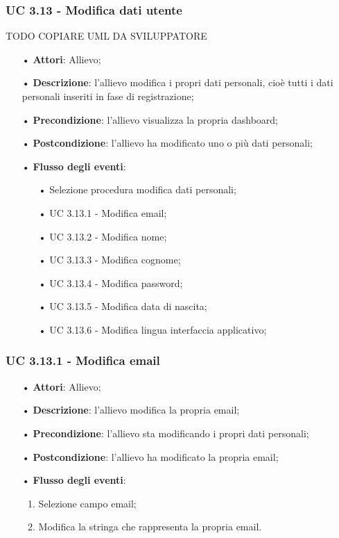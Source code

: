 \subsubsection{UC 3.13 - Modifica dati utente}
{\huge TODO  COPIARE UML DA SVILUPPATORE}
\begin{itemize}
\item[•] \textbf{Attori}: Allievo;
\item[•] \textbf{Descrizione}: l'allievo modifica i propri dati personali, cioè tutti i dati personali inseriti in fase di registrazione;
\item[•] \textbf{Precondizione}: l'allievo visualizza la propria dashboard;
\item[•] \textbf{Postcondizione}: l'allievo ha modificato uno o più dati personali;
\item[•] \textbf{Flusso degli eventi}:
\begin{enumerate}
	\item[•] Selezione procedura modifica dati personali;
	\item[•] UC 3.13.1 - Modifica email;
	\item[•] UC 3.13.2 - Modifica nome;
	\item[•] UC 3.13.3 - Modifica cognome;
	\item[•] UC 3.13.4 - Modifica password;
	\item[•] UC 3.13.5 - Modifica data di nascita;
	\item[•] UC 3.13.6 - Modifica lingua interfaccia applicativo;
\end{enumerate}
\end{itemize}


\subsubsection{UC 3.13.1 - Modifica email}
\begin{itemize}
	\item[•]\textbf{Attori}: Allievo;
	\item[•]\textbf{Descrizione}: l'allievo modifica la propria email;
	\item[•]\textbf{Precondizione}: l'allievo sta modificando i propri dati personali;
	\item[•]\textbf{Postcondizione}: l'allievo ha modificato la propria email; 
	\item[•]\textbf{Flusso degli eventi}: 
	\begin{enumerate}
		\item Selezione campo email;
		\item Modifica la stringa che rappresenta la propria email.
	\end{enumerate}
\end{itemize}
